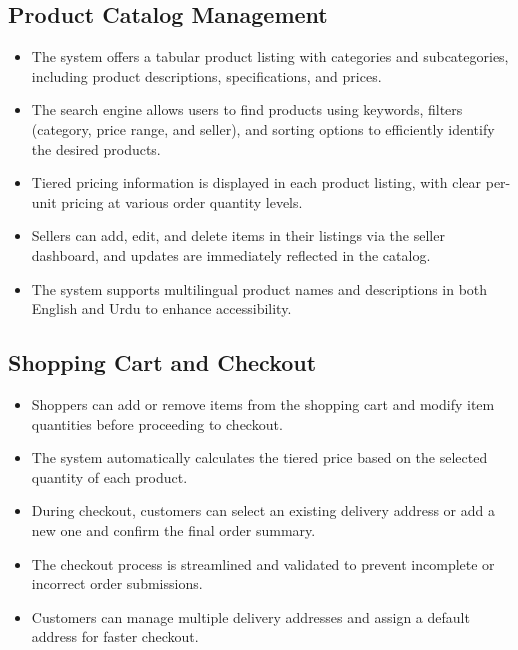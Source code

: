 \subsection{Product Catalog Management}
\begin{itemize}
    \item The system offers a tabular product listing with categories and subcategories, including product descriptions, specifications, and prices.
    
    \item The search engine allows users to find products using keywords, filters (category, price range, and seller), and sorting options to efficiently identify the desired products.
    
    \item Tiered pricing information is displayed in each product listing, with clear per-unit pricing at various order quantity levels.
    
    \item Sellers can add, edit, and delete items in their listings via the seller dashboard, and updates are immediately reflected in the catalog.
    
    \item The system supports multilingual product names and descriptions in both English and Urdu to enhance accessibility.
\end{itemize}

\subsection{Shopping Cart and Checkout}
\begin{itemize}
    \item Shoppers can add or remove items from the shopping cart and modify item quantities before proceeding to checkout.
    
    \item The system automatically calculates the tiered price based on the selected quantity of each product.
    
    \item During checkout, customers can select an existing delivery address or add a new one and confirm the final order summary.
    
    \item The checkout process is streamlined and validated to prevent incomplete or incorrect order submissions.
    
    \item Customers can manage multiple delivery addresses and assign a default address for faster checkout.
\end{itemize}


